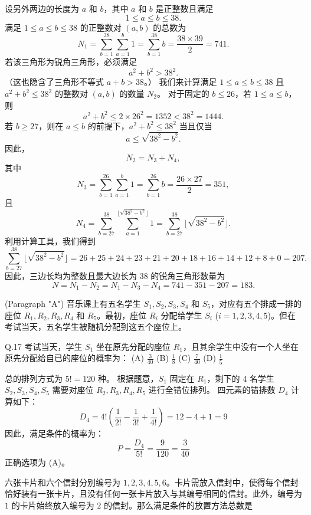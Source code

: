 \begin{questions}
\begin{solution}
设另外两边的长度为 $a$ 和 $b$，其中 $a$ 和 $b$ 是正整数且满足
\[
1 \le a \le b \le 38.
\]
满足 $1 \le a \le b \le 38$ 的正整数对 $(a, b)$ 的总数为
\[
N_1 = \sum_{b=1}^{38} \sum_{a=1}^{b} 1 = \sum_{b=1}^{38} b = \frac{38 \times 39}{2} = 741.
\]
若该三角形为锐角三角形，必须满足
\[
a^2 + b^2 > 38^2.
\]
（这也隐含了三角形不等式 $a + b > 38$。）
我们来计算满足 $1 \le a \le b \le 38$ 且 $a^2 + b^2 \le 38^2$ 的整数对 $(a, b)$ 的数量 $N_2$。
对于固定的 $b \le 26$，若 $1 \le a \le b$，则
\[
a^2 + b^2 \le 2 \times 26^2 = 1352 < 38^2 = 1444.
\]
若 $b \ge 27$，则在 $a \le b$ 的前提下，$a^2 + b^2 \le 38^2$ 当且仅当
\[
a \le \sqrt{38^2 - b^2}.
\]
因此，
\[
N_2 = N_3 + N_4,
\]
其中
\[
N_3 = \sum_{b=1}^{26} \sum_{a=1}^{b} 1 = \sum_{b=1}^{26} b = \frac{26 \times 27}{2} = 351,
\]
且
\[
N_4 = \sum_{b=27}^{38} \sum_{a=1}^{\lfloor \sqrt{38^2 - b^2} \rfloor} 1 = \sum_{b=27}^{38} \lfloor \sqrt{38^2 - b^2} \rfloor.
\]
利用计算工具，我们得到
\[
\sum_{b=27}^{38} \lfloor \sqrt{38^2 - b^2} \rfloor = 26 + 25 + 24 + 23 + 21 + 20 + 18 + 16 + 14 + 12 + 8 + 0 = 207.
\]
因此，三边长均为整数且最大边长为 38 的锐角三角形数量为
\[
N = N_1 - N_2 = N_1 - N_3 - N_4 = 741 - 351 - 207 = 183.
\]
\end{solution}

\question (Paragraph "A") 音乐课上有五名学生 $S_1, S_2, S_3, S_4$ 和 $S_5$，对应有五个排成一排的座位 $R_1, R_2, R_3, R_4$ 和 $R_5$。最初，座位 $R_i$ 分配给学生 $S_i$ ($i = 1, 2, 3, 4, 5$)。但在考试当天，五名学生被随机分配到这五个座位上。

Q.17 考试当天，学生 $S_1$ 坐在原先分配的座位 $R_1$，且其余学生中没有一个人坐在原先分配给自已的座位的概率为：
(A) $\frac{3}{40}$ \quad (B) $\frac{1}{8}$ \quad (C) $\frac{7}{40}$ \quad (D) $\frac{1}{5}$

\begin{solution}
总的排列方式为 $5! = 120$ 种。
根据题意，$S_1$ 固定在 $R_1$，剩下的 4 名学生 $S_2, S_3, S_4, S_5$ 需要对座位 $R_2, R_3, R_4, R_5$ 进行全错位排列。
四元素的错排数 $D_4$ 计算如下：
\[
D_4 = 4! \left( \frac{1}{2!} - \frac{1}{3!} + \frac{1}{4!} \right) = 12 - 4 + 1 = 9
\]
因此，满足条件的概率为：
\[
P = \frac{D_4}{5!} = \frac{9}{120} = \frac{3}{40}
\]
正确选项为 (A)。
\end{solution}

\question 六张卡片和六个信封分别编号为 $1, 2, 3, 4, 5, 6$。卡片需放入信封中，使得每个信封恰好装有一张卡片，且没有任何一张卡片放入与其编号相同的信封。此外，编号为 $1$ 的卡片始终放入编号为 $2$ 的信封。那么满足条件的放置方法总数是


\end{questions}
